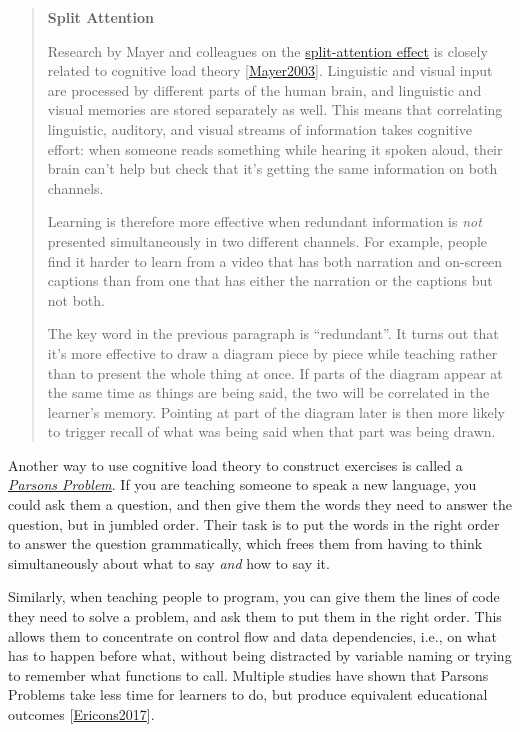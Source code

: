 \documentclass[10pt,statementpaper]{memoir}
\begin{document}
\begin{quote}
\textbf{Split Attention}

Research by Mayer and colleagues on the
\href{https://en.wikipedia.org/wiki/Split_attention_effect}{split-attention
effect} is closely related to cognitive load theory
{[}\href{biblio.html\#mayer-nine-ways}{Mayer2003}{]}. Linguistic and
visual input are processed by different parts of the human brain, and
linguistic and visual memories are stored separately as well. This means
that correlating linguistic, auditory, and visual streams of information
takes cognitive effort: when someone reads something while hearing it
spoken aloud, their brain can't help but check that it's getting the
same information on both channels.

Learning is therefore more effective when redundant information is
\emph{not} presented simultaneously in two different channels. For
example, people find it harder to learn from a video that has both
narration and on-screen captions than from one that has either the
narration or the captions but not both.

The key word in the previous paragraph is ``redundant''. It turns out
that it's more effective to draw a diagram piece by piece while teaching
rather than to present the whole thing at once. If parts of the diagram
appear at the same time as things are being said, the two will be
correlated in the learner's memory. Pointing at part of the diagram
later is then more likely to trigger recall of what was being said when
that part was being drawn.
\end{quote}

Another way to use cognitive load theory to construct exercises is
called a \emph{\href{gloss.html\#parsons-problem}{Parsons Problem}}. If
you are teaching someone to speak a new language, you could ask them a
question, and then give them the words they need to answer the question,
but in jumbled order. Their task is to put the words in the right order
to answer the question grammatically, which frees them from having to
think simultaneously about what to say \emph{and} how to say it.

Similarly, when teaching people to program, you can give them the lines
of code they need to solve a problem, and ask them to put them in the
right order. This allows them to concentrate on control flow and data
dependencies, i.e., on what has to happen before what, without being
distracted by variable naming or trying to remember what functions to
call. { Multiple studies have shown that Parsons Problems take less time
for learners to do, but produce equivalent educational outcomes
{[}\href{biblio.html\#ericson-parsons}{Ericons2017}{]}. }
\end{document}
